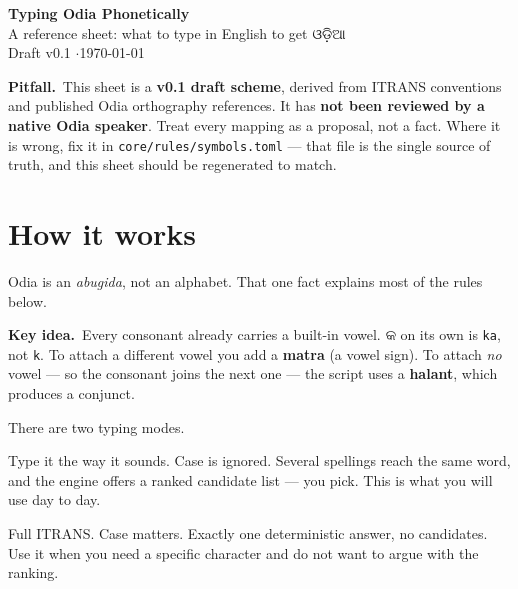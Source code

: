 \documentclass[11pt, a4paper]{article}
\newcommand{\od}[1]{{\odiafont #1}}          %
\newcommand{\kidea}{{\color{midseagreen}\textbf{\textsf{Key idea.}}}\ }
\newcommand{\kpit}{{\color{midseaorange!85!black}\textbf{\textsf{Pitfall.}}}\ }
\begin{document}

\begin{center}
  {\LARGE\bfseries\color{midseapurple} Typing Odia Phonetically}\\[0.3em]
  {\large A reference sheet: what to type in English to get \od{ଓଡ଼ିଆ}}\\[0.5em]
  {\small Draft v0.1 \quad$\cdot$\quad \today}
\end{center}

\vspace{0.5em}

\begin{warnbox}
\kpit This sheet is a \textbf{v0.1 draft scheme}, derived from ITRANS conventions and
published Odia orthography references. It has \textbf{not been reviewed by a native Odia
speaker}. Treat every mapping as a proposal, not a fact. Where it is wrong, fix it in
\texttt{core/rules/symbols.toml} --- that file is the single source of truth, and this
sheet should be regenerated to match.
\end{warnbox}

\section{How it works}

Odia is an \emph{abugida}, not an alphabet. That one fact explains most of the rules
below.

\begin{keybox}
\kidea Every consonant already carries a built-in vowel. \od{କ} on its own is
\texttt{ka}, not \texttt{k}. To attach a different vowel you add a \textbf{matra}
(a vowel sign). To attach \emph{no} vowel --- so the consonant joins the next one ---
the script uses a \textbf{halant}, which produces a conjunct.
\end{keybox}

There are two typing modes.

\begin{description}[leftmargin=1.4cm, style=nextline, itemsep=0.3em]
  \item[Natural mode \normalfont(default)] Type it the way it sounds. Case is ignored.
  Several spellings reach the same word, and the engine offers a ranked candidate list
  --- you pick. This is what you will use day to day.
  \item[Strict mode \normalfont(\texttt{-{}-strict})] Full ITRANS. Case matters. Exactly
  one deterministic answer, no candidates. Use it when you need a specific character and
  do not want to argue with the ranking.
\end{description}
\end{document}
